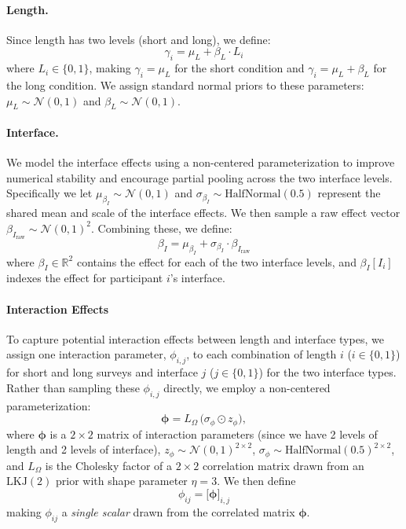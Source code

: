 \paragraph{Length.} Since length has two levels (short and long), we define:
\begin{equation}
    \gamma_i = \mu_L + \beta_L \cdot L_i 
    \label{eq:distance_model_1_eta_ordinal}
\end{equation}
where $L_i \in \{0,1\}$, making $\gamma_i = \mu_L$ for the short condition and $\gamma_i = \mu_L + \beta_L$ for the long condition. We assign standard normal priors to these parameters: $\mu_L \sim \mathcal{N}(0,1)$ and $\beta_L \sim \mathcal{N}(0,1)$. 

\paragraph{Interface.}
We model the interface effects using a non-centered parameterization to improve numerical stability and encourage partial pooling across the two interface levels. Specifically we let $\mu_{\beta_I} \sim \mathcal{N}(0,1)$ and $\sigma_{\beta_I} \sim \mathrm{HalfNormal}(0.5)$ represent the shared mean and scale of the interface effects. We then sample a raw effect vector $\beta_{I_{\text{raw}}} \sim \mathcal{N}(0,1)^2.$ Combining these, we define:
\begin{equation}
    \beta_I = \mu_{\beta_I} + \sigma_{\beta_I} \cdot \beta_{I_{\text{raw}}}
    \label{eq:distance_interface_reparam}
\end{equation}
where $\beta_I \in \mathbb{R}^2$ contains the effect for each of the two interface levels, 
and $\beta_I[I_i]$ indexes the effect for participant $i$'s interface. 

\paragraph{Interaction Effects} To capture potential interaction effects between length and interface types, we assign one interaction parameter, $\phi_{i,j}$, to each combination of length $i$ ($i \in \{0,1\}$) for short and long surveys and interface $j$ ($j \in \{0,1\}$) for the two interface types. Rather than sampling these $\phi_{i,j}$ directly, we employ a non-centered parameterization:
\[
  \boldsymbol{\phi} = L_{\Omega} \,\bigl(\sigma_{\phi} \odot z_{\phi}\bigr),
\]
where \(\boldsymbol{\phi}\) is a $2 \times 2$ matrix of interaction parameters (since we have 2 levels of length and 2 levels of interface), $z_{\phi} \sim \mathcal{N}(0,1)^{2\times2}$, $\sigma_{\phi} \sim \text{HalfNormal}(0.5)^{2\times2}$, and $L_{\Omega}$ is the Cholesky factor of a $2\times2$ correlation matrix drawn from an $\text{LKJ}(2)$ prior with shape parameter $\eta=3$. We then define
\begin{equation}
    \phi_{ij} = \bigl[\boldsymbol{\phi}\bigr]_{i,j}
\end{equation}
making $\phi_{ij}$ a \emph{single scalar} drawn from the correlated matrix $\boldsymbol{\phi}$.

